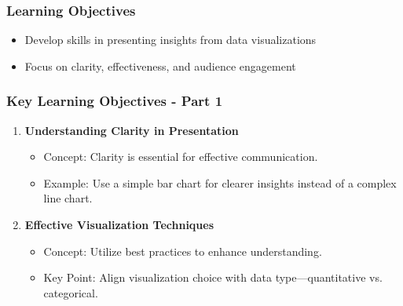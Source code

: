 \documentclass[aspectratio=169]{beamer}
\begin{document}
\begin{frame}[fragile]
    \frametitle{Learning Objectives}
    \begin{itemize}
        \item Develop skills in presenting insights from data visualizations
        \item Focus on clarity, effectiveness, and audience engagement
    \end{itemize}
\end{frame}

\begin{frame}[fragile]
    \frametitle{Key Learning Objectives - Part 1}
    \begin{enumerate}
        \item \textbf{Understanding Clarity in Presentation}
            \begin{itemize}
                \item Concept: Clarity is essential for effective communication.
                \item Example: Use a simple bar chart for clearer insights instead of a complex line chart.
            \end{itemize}
        
        \item \textbf{Effective Visualization Techniques}
            \begin{itemize}
                \item Concept: Utilize best practices to enhance understanding.
                \item Key Point: Align visualization choice with data type—quantitative vs. categorical.
            \end{itemize}
    \end{enumerate}
\end{frame}
\end{document}
